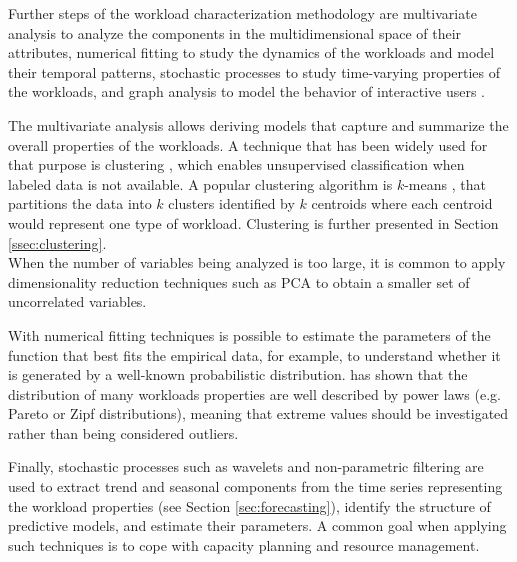 \documentclass[a4paper, 12pt]{article} %
\begin{document}
	Further steps of the workload characterization methodology are multivariate analysis to analyze the components in the multidimensional space of their attributes, numerical fitting to study the dynamics of the workloads and model their temporal patterns, stochastic processes to study time-varying properties of the workloads, and graph analysis to model the behavior of interactive users \cite{WorkloadCharacterization}.
	
	The multivariate analysis allows deriving models that capture and summarize the overall properties of the workloads. A technique that has been widely used for that purpose is clustering \cite{ClusteringSurvey}, which enables unsupervised classification when labeled data is not available. A popular clustering algorithm is $k$-means \cite{ClusteringSurvey}, that partitions the data into $k$ clusters identified by $k$ centroids where each centroid would represent one type of workload. Clustering is further presented in Section \ref{ssec:clustering}.\\
	When the number of variables being analyzed is too large, it is common to apply dimensionality reduction techniques such as PCA \cite{PCA} to obtain a smaller set of uncorrelated variables.
	
	With numerical fitting techniques is possible to estimate the parameters of the function that best fits the empirical data, for example, to understand whether it is generated by a well-known probabilistic distribution. \cite{WorkloadsPowerLaw} has shown that the distribution of many workloads properties are well described by power laws (e.g. Pareto or Zipf distributions), meaning that extreme values should be investigated rather than being considered outliers.
	
	Finally, stochastic processes such as wavelets and non-parametric filtering are used to extract trend and seasonal components from the time series representing the workload properties (see Section \ref{sec:forecasting}), identify the structure of predictive models, and estimate their parameters. A common goal when applying such techniques is to cope with capacity planning and resource management.
	
\end{document}
